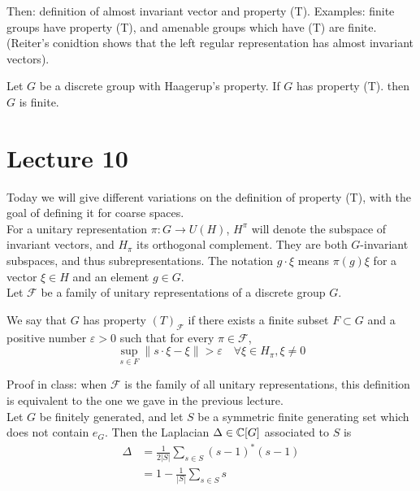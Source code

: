 Then: definition of almost invariant vector and property (T). Examples: finite groups have property (T), and amenable groups which have (T) are finite. (Reiter's conidtion shows that the left regular representation has almost invariant vectors).

\begin{prop}
Let $G$ be a discrete group with Haagerup's property. If $G$ has property (T). then $G$ is finite.
\end{prop}

\section{Lecture 10}

Today we will give different variations on the definition of property (T), with the goal of defining it for coarse spaces.\\

For a unitary representation $\pi : G \rightarrow U(H)$, $H^\pi$ will denote the subspace of invariant vectors, and $H_\pi$ its orthogonal complement. They are both $G$-invariant subspaces, and thus subrepresentations. The notation $g\cdot \xi $ means $\pi(g)\xi$ for a vector $\xi \in H$ and an element $g\in G$. \\

Let $\mathcal F$ be a family of unitary representations of a discrete group $G$. 

\begin{definition} 
We say that $G$ has property $(T)_{\mathcal F}$ if there exists a finite subset $F\subset G$ and a positive number $\varepsilon>0$ such that for every $\pi\in \mathcal F$, 
\[\sup_{s\in F} \|s\cdot \xi - \xi\| >\varepsilon \quad \forall \xi \in H_\pi , \xi \ne 0\]
\end{definition}

Proof in class: when $\mathcal F$ is the family of all unitary representations, this definition is equivalent to the one we gave in the previous lecture.\\

Let $G$ be finitely generated, and let $S$ be a symmetric finite generating set which does not contain $e_G$. Then the Laplacian $\Delta \in \mathbb C [G]$ associated to $S$ is 
\[\begin{split}
\Delta & = \frac{1}{2|S|}\sum_{s\in S} (s-1)^*(s-1) \\
& = 1- \frac{1}{|S|}\sum_{s\in S}s
\end{split}\]

